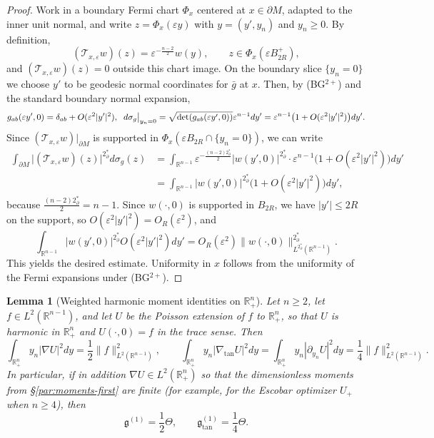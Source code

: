 \documentclass[11pt,reqno,a4paper]{amsart}
\newcommand{\R}{\mathbb{R}}
\numberwithin{equation}{section}
\theoremstyle{plain}
\newtheorem{lemma}[theorem]{Lemma}
\theoremstyle{remark}
\theoremstyle{plain}
\begin{document}
\begin{proof}
Work in a boundary Fermi chart $\Phi_x$ centered at $x\in\partial M$, adapted to the inner
unit normal, and write $z=\Phi_x(\varepsilon y)$ with $y=(y',y_n)$ and $y_n\ge0$.
By definition,
\[
(\mathcal T_{x,\varepsilon}w)(z)=\varepsilon^{-\frac{n-2}{2}}w(y),
\qquad z\in \Phi_x(\varepsilon B^+_{2R}),
\]
and $(\mathcal T_{x,\varepsilon}w)(z)=0$ outside this chart image. On the boundary slice
$\{y_n=0\}$ we choose $y'$ to be geodesic normal coordinates for $\bar g$ at $x$. Then,
by \textup{(BG$^{2+}$)} and the standard boundary normal expansion,
\[
g_{ab}(\varepsilon y',0)=\delta_{ab}+O(\varepsilon^2|y'|^2),\hspace{2mm}
d\sigma_g\big|_{y_n=0}=\sqrt{\det(g_{ab}(\varepsilon y',0))}\varepsilon^{n-1}dy'
=\varepsilon^{n-1}\big(1+O(\varepsilon^2|y'|^2)\big)dy'.
\]
Since $(\mathcal T_{x,\varepsilon}w)|_{\partial M}$ is supported in
$\Phi_x(\varepsilon B_{2R}\cap\{y_n=0\})$, we can write
\begin{align*}
\int_{\partial M} \big|(\mathcal T_{x,\varepsilon}w)(z)\big|^{2^*_{\partial}}d\sigma_g(z)
&= \int_{\R^{n-1}} \varepsilon^{-\frac{(n-2)2^*_{\partial}}{2}}|w(y',0)|^{2^*_{\partial}}
\cdot \varepsilon^{n-1}\big(1+O(\varepsilon^2|y'|^2)\big)dy'\\
&= \int_{\R^{n-1}} |w(y',0)|^{2^*_{\partial}}\big(1+O(\varepsilon^2|y'|^2)\big)dy',
\end{align*}
because $\frac{(n-2)2^*_{\partial}}{2}=n-1$. Since $w(\cdot,0)$ is supported in $B_{2R}$,
we have $|y'|\le2R$ on the support, so $O(\varepsilon^2|y'|^2)=O_R(\varepsilon^2)$, and
\[
\int_{\R^{n-1}} |w(y',0)|^{2^*_{\partial}}O(\varepsilon^2|y'|^2)dy'
= O_R(\varepsilon^2)\|w(\cdot,0)\|_{L^{2^*_{\partial}}(\R^{n-1})}^{2^*_{\partial}}.
\]
This yields the desired estimate. Uniformity in $x$ follows from the uniformity of the Fermi
expansions under \textup{(BG$^{2+}$)}.
\end{proof}

\begin{lemma}[Weighted harmonic moment identities on $\R^n_+$]\label{lem:harmonic-y-moments}
Let $n\ge2$, let $f\in L^2(\R^{n-1})$, and let $U$ be the Poisson extension of $f$ to
$\R^n_+$, so that $U$ is harmonic in $\R^n_+$ and $U(\cdot,0)=f$ in the trace sense. Then
\begin{equation}\label{eq:moment-equalities}
\int_{\R^n_+} y_n|\nabla U|^2dy = \frac12\|f\|_{L^2(\R^{n-1})}^2,\qquad
\int_{\R^n_+} y_n|\nabla_{\tan} U|^2dy = \int_{\R^n_+} y_n|\partial_{y_n} U|^2dy = \frac14\|f\|_{L^2(\R^{n-1})}^2.
\end{equation}
In particular, if in addition $\nabla U\in L^2(\R^n_+)$ so that the dimensionless moments
from \S\ref{par:moments-first} are finite (for example, for the Escobar optimizer $U_+$ when
$n\ge4$), then
\begin{equation}\label{eq:dimensionless-relations}
\mathfrak g^{(1)} = \frac12\Theta,
\qquad
\mathfrak g^{(1)}_{\tan} = \frac14\Theta.
\end{equation}
\end{lemma}
\end{document}

